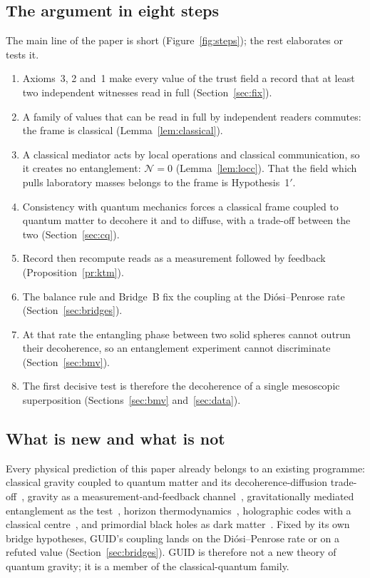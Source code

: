 \documentclass[11pt,a4paper]{article}
\begin{document}

\subsection{The argument in eight steps}\label{sec:steps}

The main line of the paper is short (Figure~\ref{fig:steps}); the rest elaborates or tests it.
\begin{enumerate}[nosep]
\item Axioms~3, 2 and~1 make every value of the trust field a record that at least two independent witnesses read in full
(Section~\ref{sec:fix}).
\item A family of values that can be read in full by independent readers commutes: the frame is classical (Lemma~\ref{lem:classical}).
\item A classical mediator acts by local operations and classical communication, so it creates no entanglement: $\mathcal N=0$
(Lemma~\ref{lem:locc}). That the field which pulls laboratory masses belongs to the frame is Hypothesis~1$'$.
\item Consistency with quantum mechanics forces a classical frame coupled to quantum matter to decohere it and to diffuse, with a
trade-off between the two (Section~\ref{sec:cq}).
\item Record then recompute reads as a measurement followed by feedback (Proposition~\ref{pr:ktm}).
\item The balance rule and Bridge~B fix the coupling at the Di\'osi--Penrose rate (Section~\ref{sec:bridges}).
\item At that rate the entangling phase between two solid spheres cannot outrun their decoherence, so an entanglement experiment cannot
discriminate (Section~\ref{sec:bmv}).
\item The first decisive test is therefore the decoherence of a single mesoscopic superposition (Sections~\ref{sec:bmv}
and~\ref{sec:data}).
\end{enumerate}


\subsection{What is new and what is not}\label{sec:new}

Every physical prediction of this paper already belongs to an existing programme: classical gravity coupled to quantum matter and its
decoherence-diffusion trade-off~\cite{oppenheim,osswd}, gravity as a measurement-and-feedback channel~\cite{ktm,tilloydiosi},
gravitationally mediated entanglement as the test~\cite{bose,mv,ggs}, horizon thermodynamics~\cite{unruh,hawking75,jacobson95},
holographic codes with a classical centre~\cite{harlow}, and primordial black holes as dark matter~\cite{gortongreen}. Fixed by its own
bridge hypotheses, GUID's coupling lands on the Di\'osi--Penrose rate or on a refuted value (Section~\ref{sec:bridges}). GUID is
therefore not a new theory of quantum gravity; it is a member of the classical-quantum family.
\end{document}
